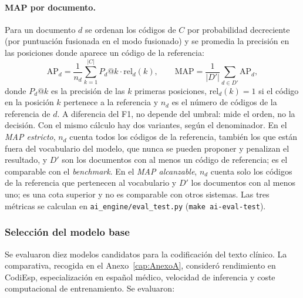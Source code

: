 \paragraph{MAP por documento.} Para un documento $d$ se ordenan los códigos de $C$ por probabilidad decreciente (por puntuación fusionada en el modo fusionado) y se promedia la precisión en las posiciones donde aparece un código de la referencia:
\begin{equation}
\mathrm{AP}_d=\frac{1}{n_d}\sum_{k=1}^{|C|}P_d@k\cdot \mathrm{rel}_d(k),\qquad \mathrm{MAP}=\frac{1}{|D'|}\sum_{d\in D'}\mathrm{AP}_d,
\end{equation}
donde $P_d@k$ es la precisión de las $k$ primeras posiciones, $\mathrm{rel}_d(k)=1$ si el código en la posición $k$ pertenece a la referencia y $n_d$ es el número de códigos de la referencia de $d$. A diferencia del F1, no depende del umbral: mide el orden, no la decisión. Con el mismo cálculo hay dos variantes, según el denominador. En el \emph{MAP estricto}, $n_d$ cuenta todos los códigos de la referencia, también los que están fuera del vocabulario del modelo, que nunca se pueden proponer y penalizan el resultado, y $D'$ son los documentos con al menos un código de referencia; es el comparable con el \emph{benchmark}. En el \emph{MAP alcanzable}, $n_d$ cuenta solo los códigos de la referencia que pertenecen al vocabulario y $D'$ los documentos con al menos uno; es una cota superior y no es comparable con otros sistemas. Las tres métricas se calculan en \texttt{ai\_engine/\allowbreak{}eval\_test.py} (\texttt{make ai-eval-test}).

\subsubsection{Selección del modelo base}

Se evaluaron diez modelos candidatos para la codificación del texto clínico. La comparativa, recogida en el Anexo~\ref{cap:AnexoA}, consideró rendimiento en CodiEsp, especialización en español médico, velocidad de inferencia y coste computacional de entrenamiento. Se evaluaron:

